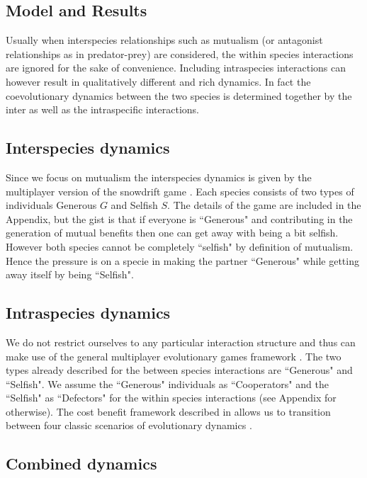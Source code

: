 \documentclass{pnastwo}
\begin{document}
\begin{article}
\section{Model and Results}

Usually when interspecies relationships such as mutualism (or antagonist relationships as in predator-prey) are considered, the within species interactions are ignored for the sake of convenience. Including intraspecies interactions can however result in qualitatively different and rich dynamics.
In fact the coevolutionary dynamics between the two species is determined together by the inter as well as the intraspecific interactions.

\subsection{Interspecies dynamics}

Since we focus on mutualism the interspecies dynamics is given by the multiplayer version of the snowdrift game \cite{bergstrom:PNAS:2003,souza:JTB:2009,gokhale:PRSB:2012}.
Each species consists of two types of individuals Generous $G$ and Selfish $S$. 
The details of the game are included in the Appendix, but the gist is that if everyone is ``Generous" and contributing in the generation of mutual benefits then one can get away with being a bit selfish. However both species cannot be completely ``selfish" by definition of mutualism.
Hence the pressure is on a specie in making the partner ``Generous" while getting away itself by being ``Selfish".

\subsection{Intraspecies dynamics}

We do not restrict ourselves to any particular interaction structure and thus can make use of the general multiplayer evolutionary games framework \cite{gokhale:PNAS:2010,gokhale:DGAA:2014}.
The two types already described for the between species interactions are ``Generous" and ``Selfish".
We assume the ``Generous" individuals as ``Cooperators" and the ``Selfish" as ``Defectors" for the within species interactions (see Appendix for otherwise).
The cost benefit framework described in \cite{eshel:AmNat:1988,hauert:JTB:2006a}
 allows us to transition between four classic scenarios of evolutionary dynamics \cite{nowak:Science:2004}.


\subsection{Combined dynamics}




\end{article}
\end{document}
